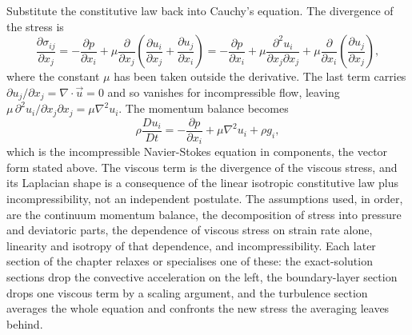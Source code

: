 Substitute the constitutive law back into Cauchy's equation. The
divergence of the stress is
\[
\frac{\partial\sigma_{ij}}{\partial x_j} = -\frac{\partial p}{\partial
x_i} + \mu\frac{\partial}{\partial x_j}\!\left(\frac{\partial u_i}{
\partial x_j} + \frac{\partial u_j}{\partial x_i}\right) =
-\frac{\partial p}{\partial x_i} + \mu\frac{\partial^2 u_i}{\partial
x_j\partial x_j} + \mu\frac{\partial}{\partial x_i}\!\left(
\frac{\partial u_j}{\partial x_j}\right),
\]
where the constant $\mu$ has been taken outside the derivative. The
last term carries $\partial u_j/\partial x_j = \nabla\cdot\vec u = 0$
and so vanishes for incompressible flow, leaving $\mu\,\partial^2
u_i/\partial x_j\partial x_j = \mu\nabla^2 u_i$. The momentum balance
becomes
\[
\rho\frac{Du_i}{Dt} = -\frac{\partial p}{\partial x_i} + \mu\nabla^2
u_i + \rho g_i,
\]
which is the incompressible Navier-Stokes equation in components, the
vector form stated above. The viscous term is the divergence of the
viscous stress, and its Laplacian shape is a consequence of the linear
isotropic constitutive law plus incompressibility, not an independent
postulate. The assumptions used, in order, are the continuum momentum
balance, the decomposition of stress into pressure and deviatoric
parts, the dependence of viscous stress on strain rate alone, linearity
and isotropy of that dependence, and incompressibility. Each later
section of the chapter relaxes or specialises one of these: the
exact-solution sections drop the convective acceleration on the left,
the boundary-layer section drops one viscous term by a scaling
argument, and the turbulence section averages the whole equation and
confronts the new stress the averaging leaves behind.

